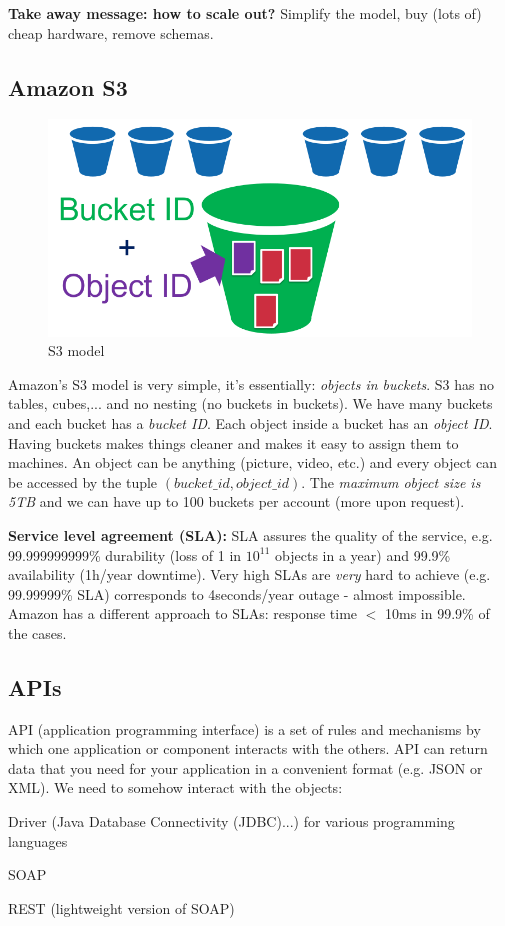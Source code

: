 \documentclass[11pt,oneside,a4paper]{article}
\begin{document}
\textbf{Take away message: how to scale out?} Simplify the model, buy (lots of) cheap hardware, remove schemas.

\newpage

\subsection{Amazon S3}

\begin{figure}
	\centering
	\includegraphics[width=0.2\linewidth]{figures/s3_buckets}
	\caption{S3 model}
	\label{fig:s3buckets}
\end{figure}

Amazon's S3 model is very simple, it's essentially: \textit{objects in buckets}. S3 has no tables, cubes,... and no nesting (no buckets in buckets). We have many buckets and each bucket has a \textit{bucket ID}. Each object inside a bucket has an \textit{object ID}. Having buckets makes things cleaner and makes it easy to assign them to machines. An object can be anything (picture, video, etc.) and every object can be accessed by the tuple $(bucket\_id, object\_id)$. The \textit{maximum object size is 5TB} and we can have up to 100 buckets per account (more upon request).

\textbf{Service level agreement (SLA):} SLA assures the quality of the service, e.g. 99.999999999\% durability (loss of 1 in $10^{11}$ objects in a year) and 99.9\% availability (1h/year downtime). Very high SLAs are \textit{very} hard to achieve (e.g. 99.99999\% SLA) corresponds to 4seconds/year outage - almost impossible. Amazon has a different approach to SLAs: response time $<$ 10ms in 99.9\% of the cases.

\subsection{APIs}

API (application programming interface) is a set of rules and mechanisms by which one application or component interacts with the others. API can return data that you need for your application in a convenient format (e.g. JSON or XML). We need to somehow interact with the objects:

\begin{compactitem}
	\item Driver (Java Database Connectivity (JDBC)...) for various programming languages
	\item SOAP
	\item REST (lightweight version of SOAP)\\
\end{compactitem}
\end{document}

